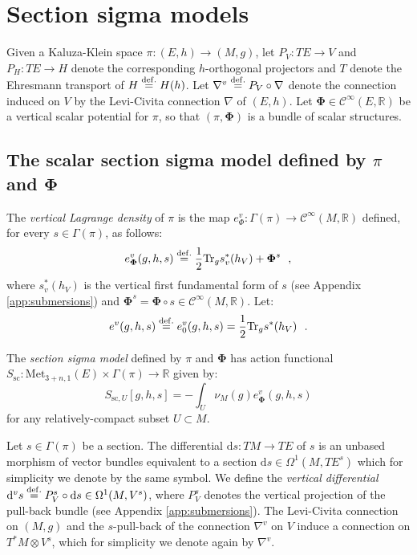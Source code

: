 \documentclass[10pt, cmp, numbook, final, a4paper]{svjour}
\newcommand{\eqdef}{\stackrel{{\rm def.}}{=}}
\def\R{\mathbb{R}}
\def\dd{\mathrm{d}}
\newcommand{\be}{\begin{equation*}}
\newcommand{\ee}{\end{equation*}}
\newcommand{\ben}{\begin{equation}}
\newcommand{\een}{\end{equation}}
\newcommand{\Tr}{\mathrm{Tr}}
\def\cC{{\mathcal C}}
\def\cC{\mathcal{C}}
\def\bPhi{\mathbf{\Phi}}
\def\Met{\mathrm{Met}}
\def\sc{\mathrm{sc}}
\begin{document}
\section{Section sigma models}
\label{sec:scalarsection}

Given a Kaluza-Klein space $\pi:(E,h)\rightarrow (M,g)$, let
$P_V:TE\rightarrow V$ and $P_H:TE\rightarrow H$ denote the
corresponding $h$-orthogonal projectors and $T$ denote the Ehresmann
transport of $H\eqdef H(h)$. Let $\nabla^v\eqdef P_V\circ \nabla$
denote the connection induced on $V$ by the Levi-Civita connection
$\nabla$ of $(E,h)$. Let $\bPhi\in \cC^\infty(E,\R)$ be a vertical
scalar potential for $\pi$, so that $(\pi,\bPhi)$ is a bundle of
scalar structures.

\subsection{The scalar section sigma model defined by $\pi$ and $\bPhi$}

\begin{definition}
The {\em vertical Lagrange density} of $\pi$ is the map
$e^v_\Phi:\Gamma(\pi)\rightarrow \cC^\infty(M,\R)$ defined, for every
$s\in \Gamma(\pi)$, as follows:
\be
e^v_\bPhi(g,h,s)\eqdef \frac{1}{2}\Tr_{g} s^\ast_v(h_V)+\bPhi^s~~,
\ee 
where $s^\ast_v(h_V)$ is the vertical first fundamental form of $s$
(see Appendix \ref{app:submersions}) and $\bPhi^s= \bPhi\circ s\in
\cC^\infty(M,\R)$. Let:
\be
e^v(g,h,s)\eqdef e^v_0(g,h,s)=\frac{1}{2}\Tr_{g} s^\ast(h_V)~~.
\ee
\end{definition}

\begin{definition}
The {\em section sigma model} defined by $\pi$ and $\bPhi$ has action
functional $S_{\sc}\colon\Met_{3+n,1}(E)\times \Gamma(\pi)\rightarrow
\R$ given by:
\ben
\label{Ssc}
S_{\sc,U}[g, h, s]=-\int_U\nu_M(g)e^v_\bPhi(g,h,s)
\een
for any relatively-compact subset $U\subset M$. 
\end{definition}

\noindent
Let $s\in\Gamma(\pi)$ be a section. The differential $\dd s\colon
TM\to TE$ of $s$ is an unbased morphism of vector bundles equivalent
to a section $\dd s\in \Omega^{1}(M, TE^{s})$ which for simplicity we
denote by the same symbol. We define the {\em vertical differential}
$\dd^{v}s\eqdef P^{s}_{V}\circ \dd s\in\Omega^{1}(M, V^{s})$, where
$P^{s}_{V}$ denotes the vertical projection of the pull-back bundle
(see Appendix \ref{app:submersions}). The Levi-Civita connection on
$(M,g)$ and the $s$-pull-back of the connection $\nabla^{v}$ on $V$
induce a connection on $T^{\ast}M\otimes V^{s}$, which for simplicity
we denote again by $\nabla^{v}$.
\end{document}
